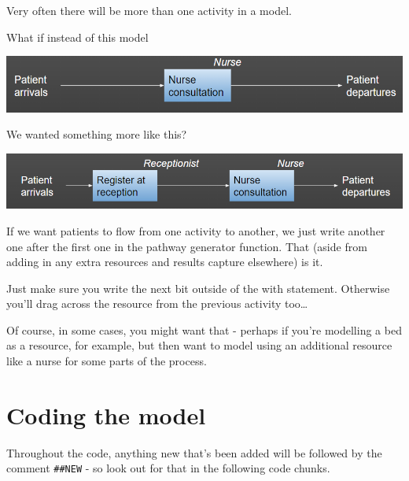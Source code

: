 \documentclass[
  letterpaper,
  DIV=11,
  numbers=noendperiod]{scrreprt}
\begin{document}
Very often there will be more than one activity in a model.

What if instead of this model

\includegraphics{images/example_simplest_model.png}

We wanted something more like this?

\includegraphics{images/example_simple_model_sequential.png}

If we want patients to flow from one activity to another, we just write
another one after the first one in the pathway generator function. That
(aside from adding in any extra resources and results capture elsewhere)
is it.

\begin{tcolorbox}[enhanced jigsaw, rightrule=.15mm, colback=white, colframe=quarto-callout-warning-color-frame, colbacktitle=quarto-callout-warning-color!10!white, toprule=.15mm, coltitle=black, opacityback=0, titlerule=0mm, bottomtitle=1mm, breakable, title=\textcolor{quarto-callout-warning-color}{\faExclamationTriangle}\hspace{0.5em}{Warning}, opacitybacktitle=0.6, toptitle=1mm, arc=.35mm, bottomrule=.15mm, leftrule=.75mm, left=2mm]

Just make sure you write the next bit outside of the with statement.
Otherwise you'll drag across the resource from the previous activity
too\ldots{}

Of course, in some cases, you might want that - perhaps if you're
modelling a bed as a resource, for example, but then want to model using
an additional resource like a nurse for some parts of the process.

\end{tcolorbox}

\section{Coding the model}\label{coding-the-model}

\begin{tcolorbox}[enhanced jigsaw, rightrule=.15mm, colback=white, colframe=quarto-callout-tip-color-frame, colbacktitle=quarto-callout-tip-color!10!white, toprule=.15mm, coltitle=black, opacityback=0, titlerule=0mm, bottomtitle=1mm, breakable, title=\textcolor{quarto-callout-tip-color}{\faLightbulb}\hspace{0.5em}{Tip}, opacitybacktitle=0.6, toptitle=1mm, arc=.35mm, bottomrule=.15mm, leftrule=.75mm, left=2mm]

Throughout the code, anything new that's been added will be followed by
the comment \texttt{\#\#NEW} - so look out for that in the following
code chunks.

\end{tcolorbox}
\end{document}
